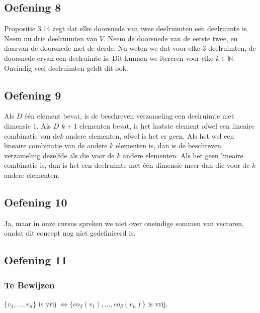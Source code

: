 \documentclass[lineaire_algebra_oplossingen.tex]{subfiles}
\begin{document}
\subsection{Oefening 8}
Propositie 3.14 zegt dat elke doorsnede van twee deelruimten een deelruimte is. Neem nu drie deelruimten van $V$. Neem de doorsnede van de eerste twee, en daarvan de doorsnede met de derde. Nu weten we dat voor elke $3$ deelruimten, de doorsnede ervan een deelruimte is. Dit kunnen we itereren voor elke $k \in \mathbb{N}$. Oneindig veel deelruimten geldt dit ook.

\subsection{Oefening 9}
Als $D$ één element bevat, is de beschreven verzameling een deelruimte met dimensie $1$. Als $D$ $k+1$ elementen bevat, is het laatste element ofwel een lineaire combinatie van de$k$ andere elementen, ofwel is het er geen. Als het wel een lineaire combinatie van de andere $k$ elementen is, dan is de beschreven verzameling dezelfde als die voor de $k$ andere elementen. Als het geen lineaire combinatie is, dan is het een deelruimte met één dimensie meer dan die voor de $k$ andere elementen.

\subsection{Oefening 10}
Ja, maar in onze cursus spreken we niet over oneindige sommen van vectoren, omdat dit concept nog niet gedefinieerd is.


\subsection{Oefening 11}
\subsubsection*{Te Bewijzen}
$\{v_1,...,v_n\}$ is vrij $\Leftrightarrow \{co_{\beta}(v_1),...,co_{\beta}(v_n)\}$ is vrij.
\end{document}

